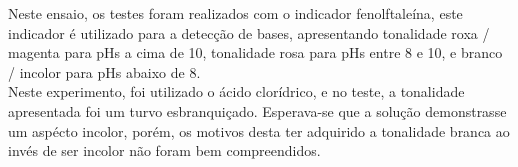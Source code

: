 \begin{figure}[ht]
                \label{fig:experimento14}
        \end{figure}
		
		\indent Neste ensaio, os testes foram realizados com o indicador fenolftaleína, este indicador é utilizado para a detecção de bases, apresentando tonalidade roxa / magenta para pHs a cima de 10, tonalidade rosa para pHs entre 8 e 10, e branco / incolor para pHs abaixo de 8.\\
		
		\indent Neste experimento, foi utilizado o ácido clorídrico, e no teste, a tonalidade apresentada foi um turvo esbranquiçado. Esperava-se que a solução demonstrasse um aspécto incolor, porém, os motivos desta ter adquirido a tonalidade branca ao invés de ser incolor não foram bem compreendidos.\\
			
